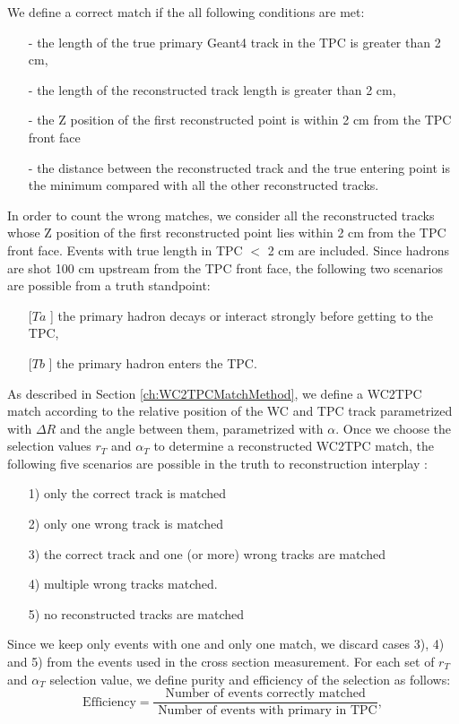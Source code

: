 We define a correct match if the all following conditions are met:
\begin{itemize}
\item[-] the length of the true primary Geant4 track in the TPC is greater than 2 cm,  
\item[-] the length of the reconstructed track length is greater than 2 cm,
\item[-] the Z position of the first reconstructed point is within 2 cm from the TPC front face
\item[-] the distance between the reconstructed track and the true entering point is the minimum compared with all the other reconstructed tracks.
\end{itemize}

In order to count the wrong matches, we consider all the reconstructed tracks whose Z position of the first reconstructed point lies within 2 cm from the TPC front face. Events with true length in TPC $<$ 2 cm are included. 
Since hadrons are shot 100 cm upstream from the TPC front face, the following two scenarios are possible from a truth standpoint: 
\begin{itemize}
\item[[$Ta$]] the primary hadron decays or interact strongly before getting to the TPC,
\item[[$Tb$]] the primary hadron enters the TPC.
\end{itemize}

As described in Section \ref{ch:WC2TPCMatchMethod}, we define a WC2TPC match according to the relative position of the WC and TPC track parametrized with $\Delta R$ and the angle between them, parametrized with $\alpha$. Once we choose the selection values $r_{T}$ and $\alpha_{T}$ to determine a reconstructed WC2TPC match, the following five scenarios are possible in the truth to reconstruction interplay : 
\begin{itemize}
\item[1)] only the correct track is matched
\item[2)] only one wrong track is matched 
\item[3)] the correct track and one (or more) wrong tracks are matched
\item[4)] multiple wrong tracks  matched.
\item[5)] no reconstructed tracks are matched
\end{itemize}

Since we keep only events with one and only one match, we discard cases 3), 4) and 5) from the events used in the cross section measurement. For each set of $r_{T}$ and $\alpha_{T}$ selection value, we define purity and efficiency of the selection as follows:
\begin{equation}
\text{Efficiency} = \frac{\text{Number of events correctly matched}}{\text{ Number of events with primary in TPC}},
\end{equation}


